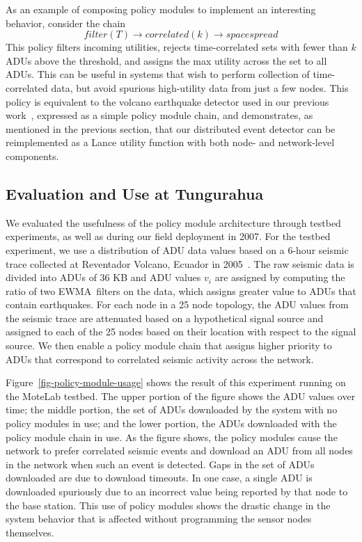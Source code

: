 As an example of composing policy modules to implement an interesting
behavior, consider the chain \[
\mathit{filter}(T)\rightarrow\mathit{correlated}(k)\rightarrow\mathit{spacespread}
\] This policy filters incoming utilities, rejects time-correlated sets with
fewer than $k$ ADUs above the threshold, and assigns the max utility across
the set to all ADUs. This can be useful in systems that wish to perform
collection of time-correlated data, but avoid spurious high-utility data from
just a few nodes.  This policy is equivalent to the volcano earthquake
detector used in our previous work~\cite{volcano-osdi06}, expressed as a
simple policy module chain, and demonstrates, as mentioned in the previous
section, that our distributed event detector can be reimplemented as a Lance
utility function with both node- and network-level components.

\subsection{Evaluation and Use at Tungurahua}
\label{subsec-policymoduleuse}

We evaluated the usefulness of the policy module architecture through testbed
experiments, as well as during our field deployment in 2007.  For the testbed
experiment, we use a distribution of ADU data values based on a 6-hour
seismic trace collected at Reventador Volcano, Ecuador in
2005~\cite{volcano-osdi06}. The raw seismic data is divided into ADUs of 36
KB and ADU values $v_i$ are assigned by computing the ratio of two
EWMA~filters on the data, which assigns greater value to ADUs that contain
earthquakes. For each node in a 25 node topology, the ADU values from the
seismic trace are attenuated based on a hypothetical signal source and
assigned to each of the 25 nodes based on their location with respect to the
signal source. We then enable a policy module chain that assigns higher
priority to ADUs that correspond to correlated seismic activity across the
network.

Figure~\ref{fig-policy-module-usage} shows the result of this experiment
running on the MoteLab testbed. The upper portion of the figure shows the ADU
values over time; the middle portion, the set of ADUs downloaded by the
system with no policy modules in use; and the lower portion, the ADUs
downloaded with the policy module chain in use.  As the figure shows, the
policy modules cause the network to prefer correlated seismic events and
download an ADU from all nodes in the network when such an event is detected.
Gaps in the set of ADUs downloaded are due to download timeouts. In one case,
a single ADU is downloaded spuriously due to an incorrect value being
reported by that node to the base station. This use of policy modules shows
the drastic change in the system behavior that is affected without
programming the sensor nodes themselves.


